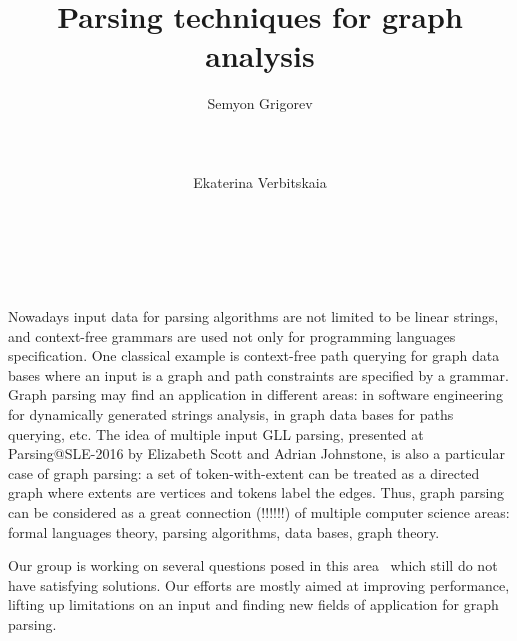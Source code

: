 \documentclass{vldb}
\begin{document}
\makeatletter
\def\@copyrightspace{\relax}
\makeatother


\title{Parsing techniques for graph analysis}



\author{
\alignauthor
       Semyon Grigorev\\
       \\
       \\
       \\
\alignauthor
       Ekaterina Verbitskaia\\
       \\
       \\
       \\
}


\maketitle
Nowadays input data for parsing algorithms are not limited to be linear strings, and context-free grammars are used not only for programming languages specification.
One classical example is context-free path querying for graph data bases where an input is a graph and path constraints are specified by a grammar.
Graph parsing may find an application in different areas: in software engineering for dynamically generated strings analysis, in graph data bases for paths querying, etc.
The idea of multiple input GLL parsing, presented at Parsing@SLE-2016 by Elizabeth Scott and Adrian Johnstone, is also a particular case of graph parsing: 
a set of token-with-extent can be treated as a directed graph where extents are vertices and tokens label the edges.
Thus, graph parsing can be considered as a great connection (!!!!!!) of multiple computer science areas: formal languages theory, parsing algorithms, data bases, graph theory.

Our group is working on several questions posed in this area~\cite{Hellings, Yannakakis} which still do not have satisfying solutions. Our efforts are mostly aimed at improving performance, lifting up limitations on an input and finding new fields of application for graph parsing. 
\end{document}

